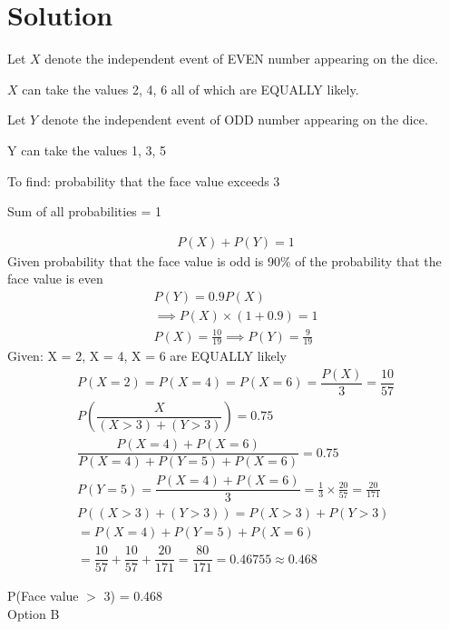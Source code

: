 \documentclass[journal,12pt,twocolumn]{IEEEtran}
\begin{document}
\section{\Large Solution}
\onehalfspacing
\begin{description}
\item Let $X$ denote the independent event of EVEN number appearing on the dice.
\item $X$ can take the values 2, 4, 6 all of which are EQUALLY likely.
\item Let $Y$ denote the independent event of ODD number appearing on the dice. 
\item Y can take the values 1, 3, 5
\item To find: probability that the face value exceeds 3
\item Sum of all probabilities = 1
\end{description}
\begin{align}
    P(X) + P(Y) = 1
\end{align}
Given probability that the face value is odd is 90\% of the probability that the face value is even
\begin{align}
    P(Y) = 0.9P(X)\\
    \implies P(X)\times (1 + 0.9) = 1\\
    P(X) = \frac{10}{19} \implies P(Y) = \frac{9}{19}
\end{align}
Given: X = 2, X = 4, X = 6 are EQUALLY likely
\begin{align}
    P(X = 2) = P(X = 4) = P(X = 6) = \dfrac{P(X)}{3} =     \dfrac{10}{57}\\
    P\left(\dfrac{X}{(X > 3) + (Y > 3)}\right) = 0.75\\
    \dfrac{P(X = 4) + P(X = 6)}{P(X = 4) + P(Y = 5) + P(X = 6)} =     0.75\\[5pt]
    P(Y = 5) = \dfrac {P(X = 4) + P(X = 6)}{3}
    = \frac{1}{3}\times\frac{20}{57} = \frac{20}{171}\\
    P((X > 3) + (Y > 3)) = P(X > 3) + P(Y > 3)\\
    = P(X = 4) + P(Y = 5) + P(X = 6)\\
    = \dfrac{10}{57} + \dfrac{10}{57} + \dfrac{20}{171} =     \dfrac{80}{171} = 0.46755 \approx 0.468
\end{align}

\centering
\Large P(Face value $>$ 3) = 0.468\\[5pt]
Option B
\end{document}
